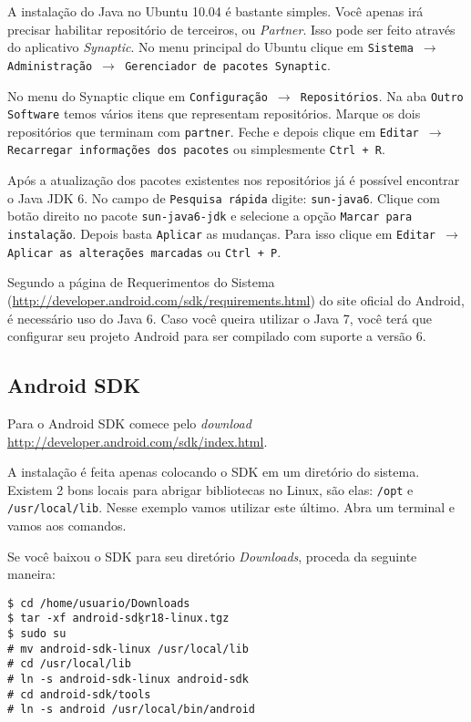 A instalação do Java no Ubuntu 10.04 é bastante simples. Você apenas irá precisar habilitar repositório
de terceiros, ou \textit{Partner}. Isso pode ser feito através do aplicativo \textit{Synaptic}. No menu
principal do Ubuntu clique em \texttt{Sistema $\rightarrow$ Administração $\rightarrow$ Gerenciador de pacotes
Synaptic}.

No menu do Synaptic clique em \texttt{Configuração $\rightarrow$ Repositórios}. Na aba \texttt{Outro Software}
temos vários itens que representam repositórios. Marque os dois repositórios que terminam com \texttt{partner}.
Feche e depois clique em \texttt{Editar $\rightarrow$ Recarregar informações dos pacotes} ou simplesmente
\texttt{Ctrl + R}.

Após a atualização dos pacotes existentes nos repositórios já é possível encontrar o Java JDK 6.
No campo de \texttt{Pesquisa rápida} digite: \texttt{sun-java6}. Clique com botão direito no pacote
\texttt{sun-java6-jdk} e selecione a opção \texttt{Marcar para instalação}. Depois basta \texttt{Aplicar}
as mudanças. Para isso clique em \texttt{Editar $\rightarrow$ Aplicar as alterações marcadas} ou \texttt{Ctrl + P}.

Segundo a página de Requerimentos do Sistema (\url{http://developer.android.com/sdk/requirements.html})
do site oficial do Android, é necessário uso do Java 6. Caso você queira utilizar o Java 7, você
terá que configurar seu projeto Android para ser compilado com suporte a versão 6.

\subsection{Android SDK \label{ssec:sdk}}

Para o Android SDK comece pelo \textit{download} \url{http://developer.android.com/sdk/index.html}.

A instalação é feita apenas colocando o SDK em um diretório do sistema. Existem 2 bons locais para
abrigar bibliotecas no Linux, são elas: \texttt{/opt} e \texttt{/usr/local/lib}. Nesse exemplo vamos
utilizar este último. Abra um terminal e vamos aos comandos.

Se você baixou o SDK para seu diretório \textit{Downloads}, proceda da seguinte maneira:

\medskip

\begin{flushleft}
\texttt{\$ cd /home/usuario/Downloads \\
\$ tar -xf android-sdk\b{ }r18-linux.tgz \\
\$ sudo su \\
\# mv android-sdk-linux /usr/local/lib \\
\# cd /usr/local/lib \\
\# ln -s android-sdk-linux android-sdk \\
\# cd android-sdk/tools \\
\# ln -s android /usr/local/bin/android \\
}
\end{flushleft}

